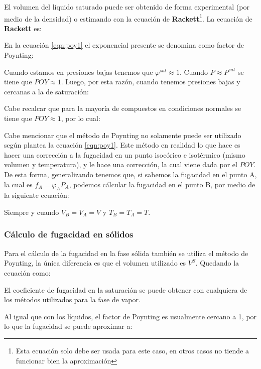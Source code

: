 El volumen del líquido saturado puede ser obtenido de forma experimental (por medio de la densidad) o estimando con la ecuación de \textbf{Rackett}\footnote{Esta ecuación solo debe ser usada para este caso, en otros casos no tiende a funcionar bien la aproximación}. La ecuación de \textbf{Rackett} es:


En la ecuación \ref{eqn:poy1} el exponencial presente se denomina como factor de Poynting:


Cuando estamos en presiones bajas tenemos que $\varphi^{sat}\approx 1$. Cuando $P\approx P^{sat}$ se tiene que $POY\approx 1$.
Luego, por esta razón, cuando tenemos presiones bajas y cercanas a la de saturación:


Cabe recalcar que para la mayoría de compuestos en condiciones normales se tiene que $POY\approx 1$, por lo cual:


Cabe mencionar que el método de Poynting no solamente puede ser utilizado según plantea la ecuación \ref{eqn:poy1}. Este método en realidad lo que hace es hacer una corrección a la fugacidad en un punto isocórico e isotérmico (mismo volumen y temperatura), y le hace una corrección, la cual viene dada por el $POY$. De esta forma,
generalizando tenemos que, si sabemos la fugacidad en el punto A, la cual es $f_A=\varphi_A P_A$, podemos cálcular la fugacidad en el punto B, por medio de la siguiente ecuación:


Siempre y cuando $V_B=V_A=V$ y $T_B=T_A=T$.
\subsubsection{Cálculo de fugacidad en sólidos}

Para el cálculo de la fugacidad en la fase sólida también se utiliza el método de Poynting, la única diferencia es que el volumen utilizado es $V^{S}$. Quedando la ecuación como:


El coeficiente de fugacidad en la saturación se puede obtener con cualquiera de los métodos utilizados para la fase de vapor.

Al igual que con los líquidos, el factor de Poynting es usualmente cercano a 1, por lo que la fugacidad se puede aproximar a:


